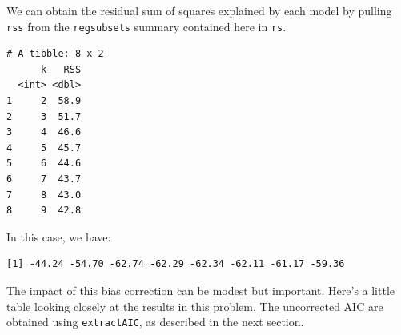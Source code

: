 \documentclass[]{book}
\newenvironment{Shaded}{\begin{snugshade}}{\end{snugshade}}
\newcommand{\KeywordTok}[1]{\textcolor[rgb]{0.13,0.29,0.53}{\textbf{#1}}}
\newcommand{\DataTypeTok}[1]{\textcolor[rgb]{0.13,0.29,0.53}{#1}}
\newcommand{\DecValTok}[1]{\textcolor[rgb]{0.00,0.00,0.81}{#1}}
\newcommand{\StringTok}[1]{\textcolor[rgb]{0.31,0.60,0.02}{#1}}
\newcommand{\CommentTok}[1]{\textcolor[rgb]{0.56,0.35,0.01}{\textit{#1}}}
\newcommand{\OperatorTok}[1]{\textcolor[rgb]{0.81,0.36,0.00}{\textbf{#1}}}
\newcommand{\NormalTok}[1]{#1}
\theoremstyle{definition}
\theoremstyle{definition}
\theoremstyle{definition}
\theoremstyle{remark}
\begin{document}
We can obtain the residual sum of squares explained by each model by
pulling \texttt{rss} from the \texttt{regsubsets} summary contained here
in \texttt{rs}.

\begin{Shaded}
\end{Shaded}

\begin{verbatim}
# A tibble: 8 x 2
      k   RSS
  <int> <dbl>
1     2  58.9
2     3  51.7
3     4  46.6
4     5  45.7
5     6  44.6
6     7  43.7
7     8  43.0
8     9  42.8
\end{verbatim}

In this case, we have:

\begin{Shaded}
\end{Shaded}

\begin{verbatim}
[1] -44.24 -54.70 -62.74 -62.29 -62.34 -62.11 -61.17 -59.36
\end{verbatim}

The impact of this bias correction can be modest but important. Here's a
little table looking closely at the results in this problem. The
uncorrected AIC are obtained using \texttt{extractAIC}, as described in
the next section.
\end{document}
